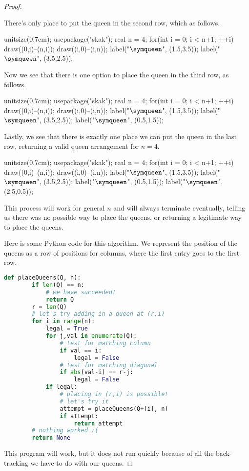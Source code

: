 \documentclass{article}
\begin{document}
\begin{proof}
\begin{center}
	\end{center}
	There's only place to put the queen in the second row, which as follows.
	\begin{center}
		\begin{asy}
			unitsize(0.7cm);
			usepackage("skak");
			real n = 4;
			for(int i = 0; i < n+1; ++i)
			{
				draw((0,i)--(n,i));
				draw((i,0)--(i,n));
			}
			label("$\symqueen$", (1.5,3.5));
			label("$\symqueen$", (3.5,2.5));
		\end{asy}
	\end{center}
	Now we see that there is one option to place the queen in the third row, as follows.
	\begin{center}
		\begin{asy}
			unitsize(0.7cm);
			usepackage("skak");
			real n = 4;
			for(int i = 0; i < n+1; ++i)
			{
				draw((0,i)--(n,i));
				draw((i,0)--(i,n));
			}
			label("$\symqueen$", (1.5,3.5));
			label("$\symqueen$", (3.5,2.5));
			label("$\symqueen$", (0.5,1.5));
		\end{asy}
	\end{center}
	Lastly, we see that there is exactly one place we can put the queen in the last row, returning a valid queen arrangement for $n=4$.
	\begin{center}
		\begin{asy}
			unitsize(0.7cm);
			usepackage("skak");
			real n = 4;
			for(int i = 0; i < n+1; ++i)
			{
				draw((0,i)--(n,i));
				draw((i,0)--(i,n));
			}
			label("$\symqueen$", (1.5,3.5));
			label("$\symqueen$", (3.5,2.5));
			label("$\symqueen$", (0.5,1.5));
			label("$\symqueen$", (2.5,0.5));
		\end{asy}
	\end{center}
	This process will work for general $n$ and will always terminate eventually, telling us there was no possible way to place the queens, or returning a legitimate way to place the queens.

	Here is some Python code for this algorithm. We represent the position of the queens as a row of positions for columns, where the first entry goes to the first row.
	\begin{lstlisting}[language=Python]
	def placeQueens(Q, n):
		if len(Q) == n:
			# we have succeeded!
			return Q
		r = len(Q)
		# let's try adding in a queen at (r,i)
		for i in range(n):
			legal = True
			for j,val in enumerate(Q):
				# test for matching column
				if val == i:
					legal = False
				# test for matching diagonal
				if abs(val-i) == r-j:
					legal = False
			if legal:
				# placing in (r,i) is possible!
				# let's try it
				attempt = placeQueens(Q+[i], n)
				if attempt:
					return attempt
		# nothing worked :(
		return None
	\end{lstlisting}
	This program will work, but it does not run quickly because of all the back-tracking we have to do with our queens.
\end{proof}
\end{document}
